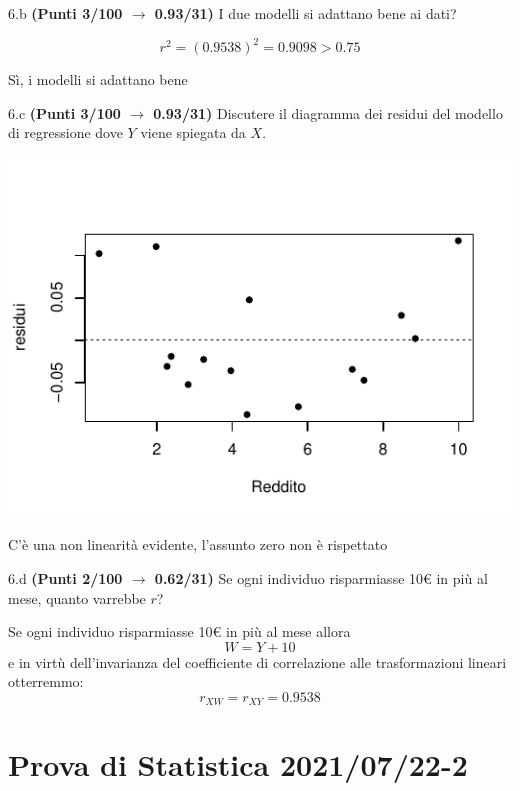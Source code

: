 \documentclass[
  11pt,
]{book}
\theoremstyle{mytheoremstyle}
\theoremstyle{mydefstyle}
\newenvironment{sol}
  {
  \begin{tcolorbox}[enhanced,breakable,arc=0.1mm,boxrule=1pt,colback=white,colframe=iblue,
  title=\bf \fontfamily{lmss}\selectfont \hspace{.5 cm} Soluzione,drop fuzzy shadow]

}{
\end{tcolorbox}
  }
\begin{document}
6.b \textbf{(Punti 3/100 \(\rightarrow\) 0.93/31)} I due modelli si adattano bene ai dati?

\begin{sol}
\[
r^2=(0.9538)^2=0.9098>0.75
\]

Sì, i modelli si adattano bene

\end{sol}

6.c \textbf{(Punti 3/100 \(\rightarrow\) 0.93/31)} Discutere il diagramma dei residui del modello di regressione dove \(Y\) viene spiegata da \(X\).

\begin{center}\includegraphics{Esami_passati_con_soluzioni_files/figure-latex/2021-74-1} \end{center}

\begin{sol}
C'è una non linearità evidente, l'assunto zero non è rispettato

\end{sol}

6.d \textbf{(Punti 2/100 \(\rightarrow\) 0.62/31)} Se ogni individuo risparmiasse 10€ in più al mese, quanto varrebbe \(r\)?

\begin{sol}
Se ogni individuo risparmiasse 10€ in più al mese allora
\[
W=Y+10
\]
e in virtù dell'invarianza del coefficiente di correlazione alle trasformazioni lineari otterremmo:
\[
r_{XW}=r_{XY}=0.9538
\]

\end{sol}

\section{Prova di Statistica 2021/07/22-2}\label{prova-di-statistica-20210722-2}
\end{document}
